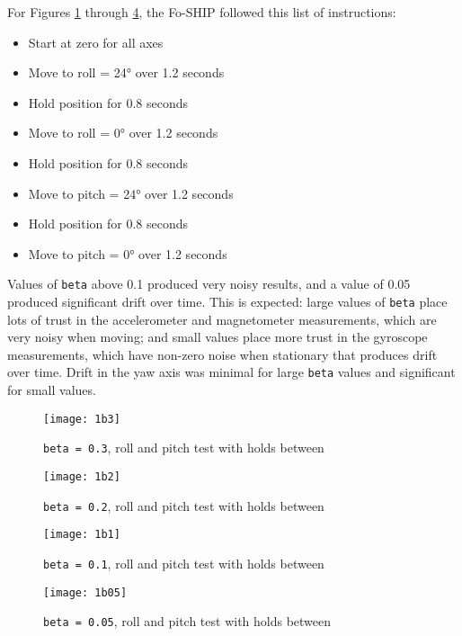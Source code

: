 \documentclass[12pt,a4paper]{report}
\begin{document}
For Figures \ref{fig:1b3} through \ref{fig:1b05}, the Fo-SHIP followed this list of instructions:
\begin{itemize}[noitemsep,topsep=0pt,]
	\item Start at zero for all axes
	\item Move to roll = 24° over 1.2 seconds
	\item Hold position for 0.8 seconds
	\item Move to roll = 0° over 1.2 seconds
	\item Hold position for 0.8 seconds
	\item Move to pitch = 24° over 1.2 seconds
	\item Hold position for 0.8 seconds
	\item Move to pitch = 0° over 1.2 seconds
\end{itemize}

Values of \verb|beta| above 0.1 produced very noisy results, and a value of 0.05 produced significant drift over time. This is expected: large values of \verb|beta| place lots of trust in the accelerometer and magnetometer measurements, which are very noisy when moving; and small values place more trust in the gyroscope measurements, which have non-zero noise when stationary that produces drift over time. Drift in the yaw axis was minimal for large \verb|beta| values and significant for small values.

\begin{figure}[htbp]
	\centering
	\texttt{[image: 1b3]}
	\caption{\texttt{beta = 0.3}, roll and pitch test with holds between}
	\label{fig:1b3}
\end{figure}

\begin{figure}[htbp]
	\centering
	\texttt{[image: 1b2]}
	\caption{\texttt{beta = 0.2}, roll and pitch test with holds between}
	\label{fig:1b2}
\end{figure}

\begin{figure}[htbp]
	\centering
	\texttt{[image: 1b1]}
	\caption{\texttt{beta = 0.1}, roll and pitch test with holds between}
	\label{fig:1b1}
\end{figure}

\begin{figure}[htbp]
	\centering
	\texttt{[image: 1b05]}
	\caption{\texttt{beta = 0.05}, roll and pitch test with holds between}
	\label{fig:1b05}
\end{figure}
\end{document}
